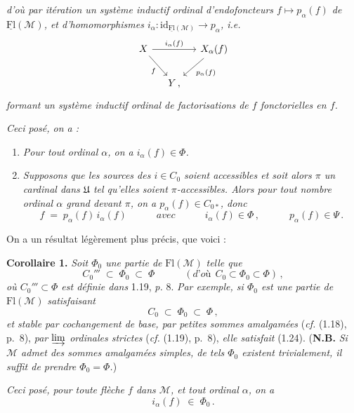\documentclass[11pt]{article}
\newcommand{\printedpage}[1]{\marginpar{\footnotesize p.~#1}}
\newcommand{\msp}[1]{\marginpar{\footnotesize [#1]}}
\newcommand{\uFl}{\underline{\mathrm{Fl}}}
\newcommand{\Fl}{\mathrm{Fl}}
\newcommand{\cM}{\mathcal{M}}
\begin{document}
\printedpage{9}

{\itshape d'où par itération un système inductif ordinal d'endofoncteurs $f\longmapsto p_\alpha(f)$ de $\uFl(\cM)$, et d'homomorphismes $i_\alpha : \mathrm{id}_{\uFl(\cM)} \longrightarrow p_\alpha$, \textup{i.e.}}
\[
\begin{tikzcd}[column sep=small]
X \arrow[rr, "i_\alpha(f)"] \arrow[dr, "f"'] & & X_\alpha(f) \arrow[dl, "p_\alpha(f)"] \\
& Y\,, &
\end{tikzcd}
\]
{\itshape formant un système inductif ordinal de factorisations de $f$ fonctorielles en $f$.}

\msp{page 11}

{\itshape Ceci posé, on a :}
\begin{enumerate}[label={}, leftmargin=*]
\item[a)] {\itshape Pour tout ordinal $\alpha$, on a $i_\alpha(f)\in\Phi$.}
\item[b)] {\itshape Supposons que les sources des $i\in C_0$ soient accessibles et soit alors $\pi$ un cardinal dans $\mathfrak{U}$ tel qu'elles soient $\pi$-accessibles. Alors pour tout nombre ordinal $\alpha$ grand devant $\pi$, on a $p_\alpha(f)\in C_{0*}$, donc}
\[
f \;=\; p_\alpha(f)\, i_\alpha(f) \qquad\quad \textit{avec} \qquad\quad i_\alpha(f)\in\Phi\,, \qquad\quad p_\alpha(f)\in\Psi\,.
\]
\end{enumerate}

On a un résultat légèrement plus précis, que voici :

\textbf{Corollaire 1.} \textit{Soit $\Phi_0$ une partie de} $\Fl(\cM)$ \textit{telle que}
\[
C_0''' \;\subset\; \Phi_0 \;\subset\; \Phi \qquad\quad (\textit{d'où}\ \ C_0\subset\Phi_0\subset\Phi)\,,
\tag*{(1.24)}
\]
\textit{où $C_0'''\subset\Phi$ est définie dans} 1.19, \textit{p.} 8. \textit{Par exemple, si $\Phi_0$ est une partie de} $\Fl(\cM)$ \textit{satisfaisant}
\[
C_0 \;\subset\; \Phi_0 \;\subset\; \Phi\,,
\]
\textit{et stable par cochangement de base, par petites sommes amalgamées} (\textit{cf.} (1.18), p.~8), \textit{par $\varinjlim$ ordinales strictes} (\textit{cf.} (1.19), p.~8), \textit{elle satisfait} (1.24). (\textbf{N.B.} \textit{Si $\cM$ admet des sommes amalgamées simples, de tels $\Phi_0$ existent trivialement, il suffit de prendre $\Phi_0=\Phi$.})

\msp{page 12}

\textit{Ceci posé, pour toute flèche $f$ dans $\cM$, et tout ordinal $\alpha$, on a}
\[
i_\alpha(f) \;\in\; \Phi_0\,.
\]
\end{document}
